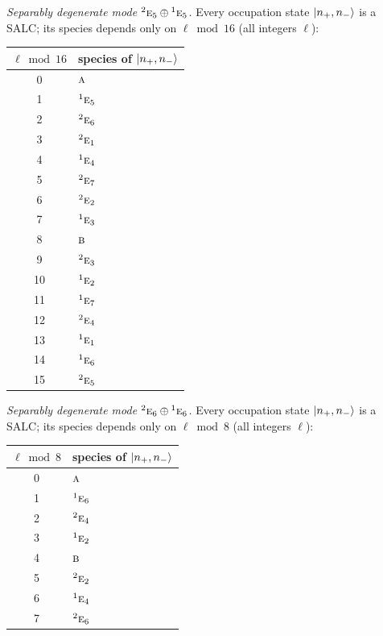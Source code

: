 \documentclass[11pt]{article}
\newcommand{\irr}[1]{\text{\normalfont\scshape #1}}
\newcommand{\conjpair}[1]{{}^{#1}}
\begin{document}
\emph{Separably degenerate mode $\conjpair{2}\irr{e}_{5}\oplus \conjpair{1}\irr{e}_{5}$.} Every occupation state $\ket{n_+,n_-}$ is a SALC; its species depends only on $\ell\bmod 16$ (all integers $\ell$):
\begin{longtable}{c l}\hline $\ell\bmod 16$ & species of $\ket{n_+,n_-}$\\ \hline\endhead
0 & $\irr{a}$\\
1 & $\conjpair{1}\irr{e}_{5}$\\
2 & $\conjpair{2}\irr{e}_{6}$\\
3 & $\conjpair{2}\irr{e}_{1}$\\
4 & $\conjpair{1}\irr{e}_{4}$\\
5 & $\conjpair{2}\irr{e}_{7}$\\
6 & $\conjpair{2}\irr{e}_{2}$\\
7 & $\conjpair{1}\irr{e}_{3}$\\
8 & $\irr{b}$\\
9 & $\conjpair{2}\irr{e}_{3}$\\
10 & $\conjpair{1}\irr{e}_{2}$\\
11 & $\conjpair{1}\irr{e}_{7}$\\
12 & $\conjpair{2}\irr{e}_{4}$\\
13 & $\conjpair{1}\irr{e}_{1}$\\
14 & $\conjpair{1}\irr{e}_{6}$\\
15 & $\conjpair{2}\irr{e}_{5}$\\
\hline\end{longtable}

\emph{Separably degenerate mode $\conjpair{2}\irr{e}_{6}\oplus \conjpair{1}\irr{e}_{6}$.} Every occupation state $\ket{n_+,n_-}$ is a SALC; its species depends only on $\ell\bmod 8$ (all integers $\ell$):
\begin{longtable}{c l}\hline $\ell\bmod 8$ & species of $\ket{n_+,n_-}$\\ \hline\endhead
0 & $\irr{a}$\\
1 & $\conjpair{1}\irr{e}_{6}$\\
2 & $\conjpair{2}\irr{e}_{4}$\\
3 & $\conjpair{1}\irr{e}_{2}$\\
4 & $\irr{b}$\\
5 & $\conjpair{2}\irr{e}_{2}$\\
6 & $\conjpair{1}\irr{e}_{4}$\\
7 & $\conjpair{2}\irr{e}_{6}$\\
\hline\end{longtable}
\end{document}
